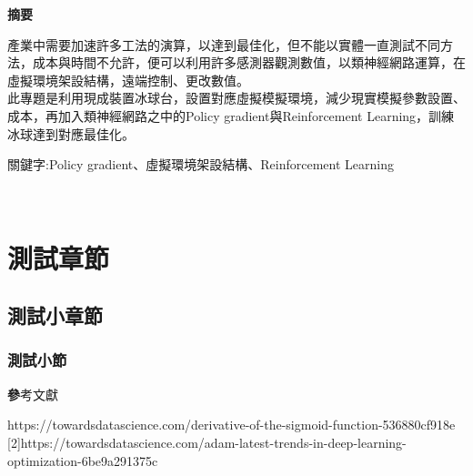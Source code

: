 \documentclass[14pt,a4paper]{report}
\begin{document}
\newpage
\clearpage
\begin{center}
\LARGE\textbf{摘要}\\
\begin{flushleft}
\fontsize{14pt}{2.5pt}\hspace{12pt} 產業中需要加速許多工法的演算，以達到最佳化，但不能以實體一直測試不同方法，成本與時間不允許，便可以利用許多感測器觀測數值，以類神經網路運算，在虛擬環境架設結構，遠端控制、更改數值。\\
\vspace{1em}
\hspace{12pt} 此專題是利用現成裝置冰球台，設置對應虛擬模擬環境，減少現實模擬參數設置、成本，再加入類神經網路之中的Policy gradient與Reinforcement Learning，訓練冰球達到對應最佳化。
\end{flushleft}
\begin{center}
\fontsize{14pt}{2.5pt}關鍵字:Policy gradient、虛擬環境架設結構、Reinforcement Learning
\end{center}
\newpage
\renewcommand{\contentsname}{\centerline{\fontsize{18pt}{\baselineskip}\selectfont\textbf{目\quad 錄}}}
\tableofcontents　　%
\newpage
\renewcommand{\listfigurename}{\centerline{\fontsize{18pt}{\baselineskip}\selectfont\textbf{圖\quad 表\quad 目\quad 錄 }}}
\listoffigures
\newpage
\end{center}
\chapter{測試章節}
\setcounter{page}{1}
\newpage
\section{測試小章節}
\newpage
\subsection{測試小節}
\newpage
\begin{center}
\LARGE\textbf 參考文獻\\
\end{center}
\begin{flushleft}
\begin{Large}
[1]\quad https://towardsdatascience.com/derivative-of-the-sigmoid-function-536880cf918e\\

[2]\quad https://towardsdatascience.com/adam-latest-trends-in-deep-learning-optimization-6be9a291375c\\
\end{Large}
\end{flushleft}
\end{document}
